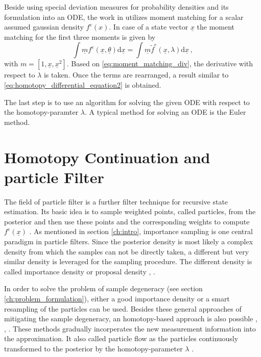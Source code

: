 \documentclass[a4paper]{IEEEtran}
\begin{document}
Beside using special deviation measures for probability densities and its formulation into an ODE, the work in \cite{hanebeck2012a} utilizes moment matching for a scalar assumed gaussian density $f^{e}(x)$. In case of a state vector $\underline{x}$
the moment matching for the first three moments is given by
\begin{equation}
    \int \underline{m}f^{e}(\underline{x},\underline{\theta}) \mathrm{d}\underline{x} = \int \underline{m} \tilde{f}^{e}(\underline{x}, \lambda) \mathrm{d}\underline{x} \,,
    \label{eq:moment_matching_div}
\end{equation}
with $m = \left[ 1, \underline{x}, \underline{x}^2 \right]$. Based on \eqref{eq:moment_matching_div}, the derivative with respect to $\lambda$ is taken. Once the terms are rearranged, a result similar to \eqref{eq:homotopy_differential_equation2} is obtained.

The last step is to use an algorithm for solving the given ODE with respect to the homotopy-paramter $\lambda$. A typical method for solving an ODE is the Euler method. 

\section{Homotopy Continuation and particle Filter}
\label{ch:homotopy_particle_filter}

The field of particle filter is a further filter technique for recursive state estimation. Its basic idea is to sample weighted points, called particles, from the
posterior and then use these points and the corresponding weights to compute $f^{e}(\underline{x})$ \cite{arulampalam2002}. 
As mentioned in section \ref{ch:intro}, importance sampling is one central paradigm in particle filters. Since the posterior density is most likely a complex density from which the samples can not be directly taken,  a different but very similar density is leveraged for the sampling procedure.
The different density is called importance density or proposal density \cite{daum2005}, \cite{chlebek2016a}.

In order to solve the problem of sample degeneracy (see section \ref{ch:problem_formulation}), either a good importance density or a smart resampling of the particles can be used. Besides these general approaches of mitigating the sample degeneracy, an homotopy-based approach is also possible \cite{chlebek2016a}, \cite{bunch2013a}, \cite{daum2013a}. These methods gradually incorperates the new
measurement information into the approximation. It also called particle flow as the particles continuously transformed to the posterior by the homotopy-parameter $\lambda$ \cite{daum2013a}.
\end{document}
